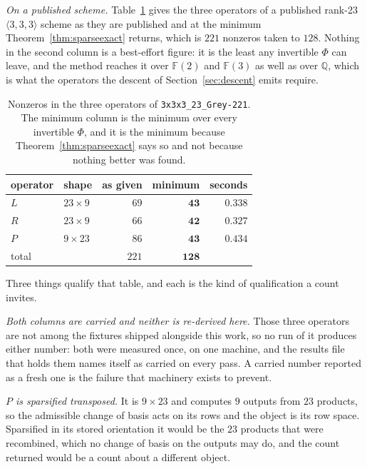 \documentclass[11pt,reqno]{amsart}
\theoremstyle{plain}
\theoremstyle{definition}
\theoremstyle{remark}
\newcommand{\GF}{\mathbb{F}}
\begin{document}
\emph{On a published scheme.} Table~\ref{tab:grey221} gives the three operators
of a published rank-23 $\langle 3,3,3\rangle$ scheme as they are published and at
the minimum Theorem~\ref{thm:sparseexact} returns, which is $221$ nonzeros taken
to $128$. Nothing in the second column is a best-effort figure: it is the least
any invertible $\Phi$ can leave, and the method reaches it over $\GF(2)$ and
$\GF(3)$ as well as over $\mathbb{Q}$, which is what the operators the descent of
Section~\ref{sec:descent} emits require.

\begin{table}[ht]
\centering
\begin{tabular}{llrrr}
\toprule
operator & shape & as given & minimum & seconds \\
\midrule
$L$   & $23\times 9$ & $69$  & $\mathbf{43}$  & $0.338$ \\
$R$   & $23\times 9$ & $66$  & $\mathbf{42}$  & $0.327$ \\
$P$   & $9\times 23$ & $86$  & $\mathbf{43}$  & $0.434$ \\
\midrule
total &              & $221$ & $\mathbf{128}$ & \\
\bottomrule
\end{tabular}
\vspace{0.5em}
\caption{Nonzeros in the three operators of \texttt{3x3x3\_23\_Grey-221}. The
minimum column is the minimum over every invertible $\Phi$, and it is the
minimum because Theorem~\ref{thm:sparseexact} says so and not because nothing
better was found.}\label{tab:grey221}
\end{table}

Three things qualify that table, and each is the kind of qualification a count
invites.

\emph{Both columns are carried and neither is re-derived here.} Those three
operators are not among the fixtures shipped alongside this work, so no run of it
produces either number: both were measured once, on one machine, and the results
file that holds them names itself as carried on every pass. A carried number
reported as a fresh one is the failure that machinery exists to prevent.

\emph{$P$ is sparsified transposed.} It is $9\times 23$ and computes $9$ outputs
from $23$ products, so the admissible change of basis acts on its rows and the
object is its row space. Sparsified in its stored orientation it would be the
$23$ products that were recombined, which no change of basis on the outputs may
do, and the count returned would be a count about a different object.
\end{document}
